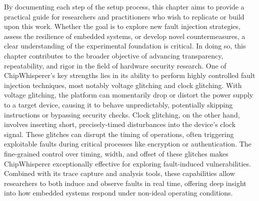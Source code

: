 By documenting each step of the setup process, this chapter aims to provide a practical guide for researchers and practitioners who wish to replicate or build upon this work. Whether the goal is to explore new fault injection strategies, assess the resilience of embedded systems, or develop novel countermeasures, a clear understanding of the experimental foundation is critical. In doing so, this chapter contributes to the broader objective of advancing transparency, repeatability, and rigor in the field of hardware security research.
One of ChipWhisperer’s key strengths lies in its ability to perform highly controlled fault injection techniques, most notably voltage glitching and clock glitching. With voltage glitching, the platform can momentarily drop or distort the power supply to a target device, causing it to behave unpredictably, potentially skipping instructions or bypassing security checks. Clock glitching, on the other hand, involves inserting short, precisely-timed disturbances into the device’s clock signal. These glitches can disrupt the timing of operations, often triggering exploitable faults during critical processes like encryption or authentication. The fine-grained control over timing, width, and offset of these glitches makes ChipWhisperer exceptionally effective for exploring fault-induced vulnerabilities. Combined with its trace capture and analysis tools, these capabilities allow researchers to both induce and observe faults in real time, offering deep insight into how embedded systems respond under non-ideal operating conditions.

